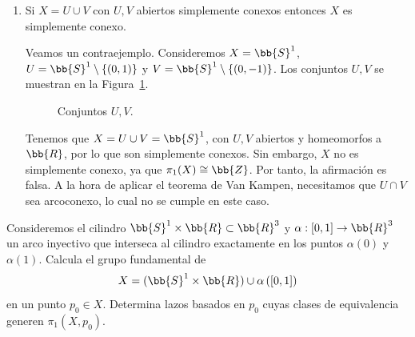 \documentclass[12pt]{article}
\begin{document}
\begin{ejercicio}[5 puntos]
\begin{enumerate}
            Por tanto, $g$ es el homomorfismo trivial. Como $g = \psi \circ f_* \circ \phi^{-1}$ y $\psi$ y $\phi$ son isomorfismos, se tiene que $f_*$ es el homomorfismo trivial. Por tanto, la afirmación es verdadera.
            \item Si $X = U \cup V$ con $U, V$ abiertos simplemente conexos entonces $X$ es simplemente conexo.
            
            Veamos un contraejemplo. Consideremos $X=\bb{S}^1$, $U = \bb{S}^1 \setminus \{(0, 1)\}$ y $V = \bb{S}^1 \setminus \{(0, -1)\}$. Los conjuntos $U,V$ se muestran en la Figura~\ref{fig:contraejemplo}.
            \begin{figure}[h]
                \centering
                \caption{Conjuntos $U,V$.}
                \label{fig:contraejemplo}
            \end{figure}

            Tenemos que $X=U \cup V = \bb{S}^1$, con $U,V$ abiertos y homeomorfos a $\bb{R}$, por lo que son simplemente conexos. Sin embargo, $X$ no es simplemente conexo, ya que $\pi_1(X) \cong \bb{Z}$. Por tanto, la afirmación es falsa. A la hora de aplicar el teorema de Van Kampen, necesitamos que $U \cap V$ sea arcoconexo, lo cual no se cumple en este caso.
        \end{enumerate}
    \end{ejercicio}

    \begin{ejercicio}[5 puntos]
        Consideremos el cilindro $\bb{S}^1 \times \bb{R} \subset \bb{R}^3$ y $\alpha: \left[0, 1\right] \to \bb{R}^3$ un arco inyectivo que interseca al cilindro exactamente en los puntos $\alpha(0)$ y $\alpha(1)$. Calcula el grupo fundamental de
        \[
            X = (\bb{S}^1 \times \bb{R}) \cup \alpha\left(\left[0, 1\right]\right)
        \]
        en un punto $p_0 \in X$. Determina lazos basados en $p_0$ cuyas clases de equivalencia generen $\pi_1(X, p_0)$.

    \end{ejercicio}
\end{document}
